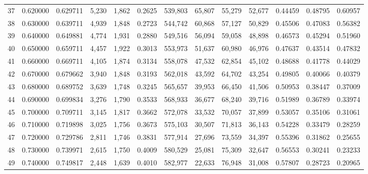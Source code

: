 \begin{tabular}{rrrrrrrrrrrrr}
37 &  0.620000 &  0.629711 &   5,230 &  1,862 &                                     0.2625 &  539,803 &   65,807 &   55,279 &   52,677 &  0.44459 &  0.48795 &  0.60957 \\
38 &  0.630000 &  0.639711 &   4,939 &  1,848 &                                     0.2723 &  544,742 &   60,868 &   57,127 &   50,829 &  0.45506 &  0.47083 &  0.56382 \\
39 &  0.640000 &  0.649881 &   4,774 &  1,931 &                                     0.2880 &  549,516 &   56,094 &   59,058 &   48,898 &  0.46573 &  0.45294 &  0.51960 \\
40 &  0.650000 &  0.659711 &   4,457 &  1,922 &                                     0.3013 &  553,973 &   51,637 &   60,980 &   46,976 &  0.47637 &  0.43514 &  0.47832 \\
41 &  0.660000 &  0.669711 &   4,105 &  1,874 &                                     0.3134 &  558,078 &   47,532 &   62,854 &   45,102 &  0.48688 &  0.41778 &  0.44029 \\
42 &  0.670000 &  0.679662 &   3,940 &  1,848 &                                     0.3193 &  562,018 &   43,592 &   64,702 &   43,254 &  0.49805 &  0.40066 &  0.40379 \\
43 &  0.680000 &  0.689752 &   3,639 &  1,748 &                                     0.3245 &  565,657 &   39,953 &   66,450 &   41,506 &  0.50953 &  0.38447 &  0.37009 \\
44 &  0.690000 &  0.699834 &   3,276 &  1,790 &                                     0.3533 &  568,933 &   36,677 &   68,240 &   39,716 &  0.51989 &  0.36789 &  0.33974 \\
45 &  0.700000 &  0.709711 &   3,145 &  1,817 &                                     0.3662 &  572,078 &   33,532 &   70,057 &   37,899 &  0.53057 &  0.35106 &  0.31061 \\
46 &  0.710000 &  0.719898 &   3,025 &  1,756 &                                     0.3673 &  575,103 &   30,507 &   71,813 &   36,143 &  0.54228 &  0.33479 &  0.28259 \\
47 &  0.720000 &  0.729786 &   2,811 &  1,746 &                                     0.3831 &  577,914 &   27,696 &   73,559 &   34,397 &  0.55396 &  0.31862 &  0.25655 \\
48 &  0.730000 &  0.739971 &   2,615 &  1,750 &                                     0.4009 &  580,529 &   25,081 &   75,309 &   32,647 &  0.56553 &  0.30241 &  0.23233 \\
49 &  0.740000 &  0.749817 &   2,448 &  1,639 &                                     0.4010 &  582,977 &   22,633 &   76,948 &   31,008 &  0.57807 &  0.28723 &  0.20965 \\

\end{tabular}

